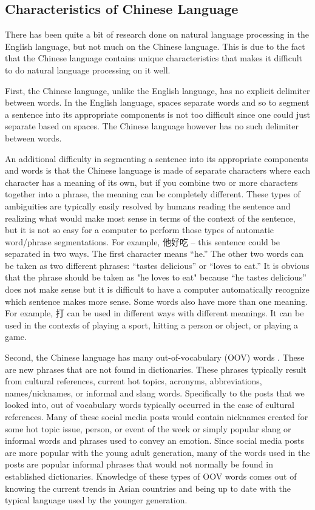 \documentclass[11pt]{article}
\newcommand{\1}[1]{{\mathbf 1}\left\{#1\right\}}        %
\begin{document}
\subsection{Characteristics of Chinese Language}\label{subsubsec:Chinese}

There has been quite a bit of research done on natural language processing in the English language, but not much on the Chinese language.  This is due to the fact that the Chinese language contains unique characteristics that makes it difficult to do natural language processing on it well. 
 
First, the Chinese language, unlike the English language, has no explicit delimiter between words. In the English language, spaces separate words and so to segment a sentence into its appropriate components is not too difficult since one could just separate based on spaces.  The Chinese language however has no such delimiter between words.
 
An additional difficulty in segmenting a sentence into its appropriate components and words is that the Chinese language is made of separate characters where each character has a meaning of its own, but if you combine two or more characters together into a phrase, the meaning can be completely different. These types of ambiguities are typically easily resolved by humans reading the sentence and realizing what would make most sense in terms of the context of the
sentence, but it is not so easy for a computer to perform those types of automatic word/phrase segmentations. For example, 他好吃 -- this sentence could be separated in two ways. The first character means ``he.'' The other two words can be taken as two different phrases: ``tastes delicious'' or ``loves to eat.''  It is obvious that the phrase should be taken as "he loves to eat" because ``he tastes delicious'' does not make sense but it is difficult to have a computer
automatically recognize which sentence makes more sense. Some words also have more than one meaning. For example, 打 can be used in different ways with different meanings. It can be used in the contexts of playing a sport, hitting a person or object, or playing a game. 

Second, the Chinese language has many out-of-vocabulary (OOV) words .  These are new phrases that are not found in dictionaries.  These phrases typically result from cultural references, current hot topics, acronyms, abbreviations, names/nicknames, or informal and slang words.  Specifically to the posts that we looked into, out of vocabulary words typically occurred in the case of cultural references.  Many of these social media posts would contain nicknames created for some hot topic issue, person, or event of the week or simply popular slang or informal words and phrases used to convey an emotion.  Since social media posts are more popular with the young adult generation, many of the words used in the posts are popular informal phrases that would not normally be found in established dictionaries. Knowledge of these types of OOV words comes out of knowing the current trends in Asian countries and being up to date with the typical language used by the younger generation.  
\end{document}
